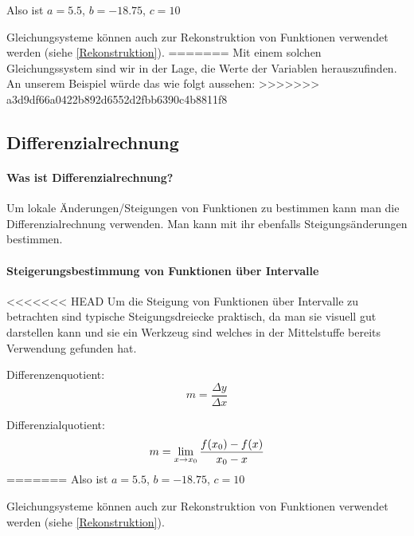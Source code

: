 \documentclass{article}
\begin{document}
			Also ist $a=5.5$, $b=-18.75$, $c=10$
			
			Gleichungsysteme können auch zur Rekonstruktion von Funktionen verwendet werden (siehe \ref{Rekonstruktion}). 
=======
Mit einem solchen Gleichungssystem sind wir in der Lage, die Werte der Variablen herauszufinden. An unserem Beispiel würde das wie folgt aussehen:
>>>>>>> a3d9df66a0422b892d6552d2fbb6390c4b8811f8

	\subsection{Differenzialrechnung}
		\paragraph{Was ist Differenzialrechnung?}
			Um lokale Änderungen/Steigungen von Funktionen zu bestimmen kann man die Differenzialrechnung verwenden.
			Man kann mit ihr ebenfalls Steigungsänderungen bestimmen.
		\paragraph{Steigerungsbestimmung von Funktionen über Intervalle}

<<<<<<< HEAD
			Um die Steigung von Funktionen über Intervalle zu betrachten sind typische Steigungsdreiecke praktisch,
			da man sie visuell gut darstellen kann und sie ein Werkzeug sind welches in der Mittelstuffe bereits
			Verwendung gefunden hat.
			 
			Differenzenquotient:
			\[
			    m = {\frac {\Delta y} {\Delta x}}
			\]
			
			Differenzialquotient:
			\[
			    m = \lim_{x \to x_{0}} {{f(x_{0}) - f(x)} \over { x_{0} - x}}
			\]
=======
Also ist $a=5.5$, $b=-18.75$, $c=10$

Gleichungsysteme können auch zur Rekonstruktion von Funktionen verwendet werden (siehe \ref{Rekonstruktion}). 
\end{document}
